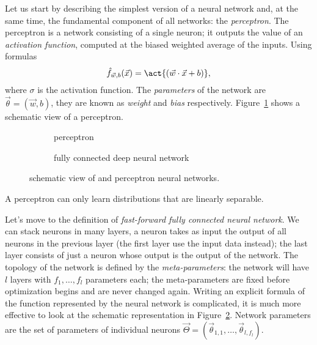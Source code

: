 Let us start by describing the simplest version of a neural network and,  at the same time, the fundamental component of all networks: the \emph{perceptron}.
The perceptron is a network consisting of a single neuron; it outputs the value of an \emph{activation function}, computed at the biased weighted average of the inputs.
Using formulas
\[
  \hat{f}_{\vec{w},b}{(\vec{x})} = \act{\left(\vec{w}\cdot\vec{x}+b\right)},
\]
where \(\sigma\) is the activation function. The \emph{parameters} of the network are \(\vec{\theta}=(\vec{w},b)\),
they are known as \emph{weight} and \emph{bias} respectively.
Figure~\ref{fig:nn_perceptron} shows a schematic view of a perceptron.
\begin{figure}
  \centering
  \begin{subfigure}{0.495\textwidth}
    \begin{tikzpicture}[x=1.5cm, y=1.2cm, >=latex]
      
    \end{tikzpicture}
    \caption{perceptron}
    \label{fig:nn_perceptron}
  \end{subfigure}
  \begin{subfigure}{0.495\textwidth}
    \begin{tikzpicture}[x=.95cm, y=1.cm, >=latex]
      
    \end{tikzpicture}
    \caption{fully connected deep neural network}
    \label{fig:nn_ffnn}
  \end{subfigure}
  \caption{
    schematic view of and perceptron neural networks.
  }
  \label{fig:nn}
\end{figure}
A perceptron can only learn distributions that are linearly separable.

Let's move to the definition of \emph{fast-forward fully connected neural network}.
We can stack neurons in many layers, a neuron takes as input the output of all neurons in the previous layer (the first layer use the input data instead);
the last layer consists of just a neuron whose output is the output of the network.
The topology of the network is defined by the \emph{meta-parameters}: the network will have \(l\) layers with \(f_1,\dots,f_l\) parameters each;
the meta-parameters are fixed before optimization begins and are never changed again.
Writing an explicit formula of the function represented by the neural network is complicated,
it is much more effective to look at the schematic representation in Figure~\ref{fig:nn_ffnn}.
Network parameters are the set of parameters of individual neurons \(\vec{\Theta} = (\vec{\theta}_{1,1},\dots,\vec{\theta}_{l,f_l})\).

